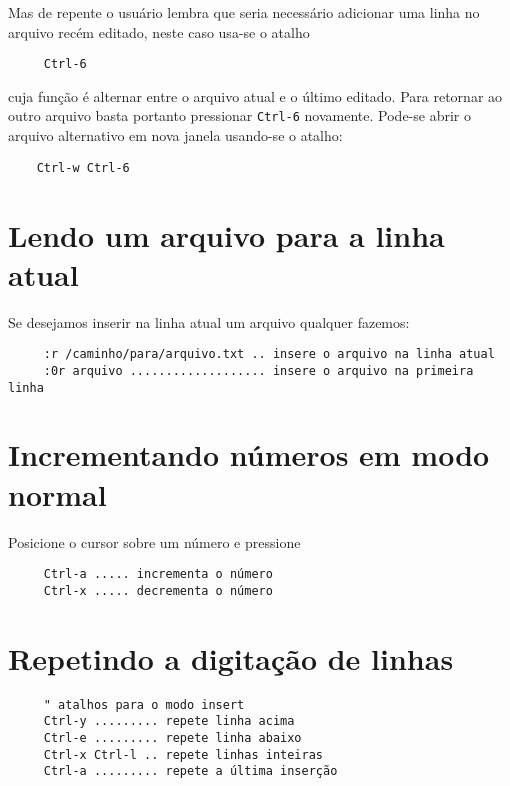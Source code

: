 Mas de repente o usuário lembra que seria necessário adicionar uma linha no
arquivo recém editado, neste caso usa-se o atalho

\begin{verbatim}
     Ctrl-6
\end{verbatim}

cuja função é alternar entre o arquivo atual e o último editado. Para retornar
ao outro arquivo basta portanto pressionar \verb|Ctrl-6| novamente. Pode-se 
abrir o arquivo alternativo em nova janela usando-se o atalho:

\begin{verbatim}
    Ctrl-w Ctrl-6
\end{verbatim}

\section{Lendo um arquivo para a linha atual}
\label{sec:Lendo um arquivo para a linha atual}

Se desejamos inserir na linha atual um arquivo qualquer fazemos:

\begin{verbatim}
	 :r /caminho/para/arquivo.txt .. insere o arquivo na linha atual
	 :0r arquivo ................... insere o arquivo na primeira linha
\end{verbatim}


\section{Incrementando números em modo normal}\label{Incrementando números em modo normal}

Posicione o cursor sobre um número e pressione

\begin{verbatim}
     Ctrl-a ..... incrementa o número
     Ctrl-x ..... decrementa o número
\end{verbatim}

\section{Repetindo a digitação de linhas}
\label{Repetindo a digitação de linhas}

\begin{verbatim}
     " atalhos para o modo insert
     Ctrl-y ......... repete linha acima
     Ctrl-e ......... repete linha abaixo
     Ctrl-x Ctrl-l .. repete linhas inteiras
     Ctrl-a ......... repete a última inserção
\end{verbatim}


